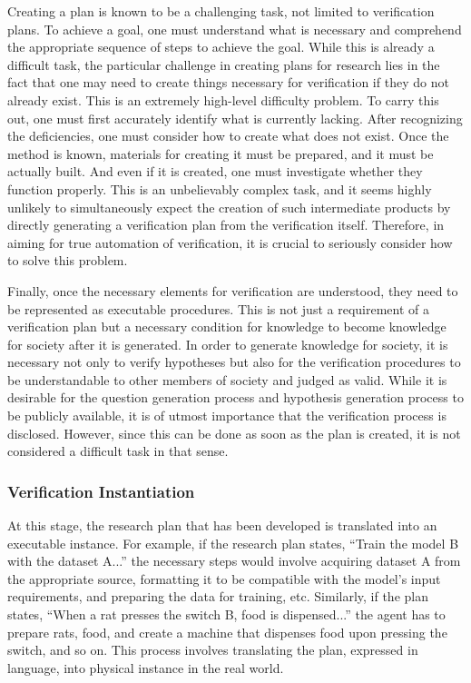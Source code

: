 \documentclass{book}
\begin{document}
Creating a plan is known to be a challenging task, not limited to verification plans. To achieve a goal, one must understand what is necessary and comprehend the appropriate sequence of steps to achieve the goal. While this is already a difficult task, the particular challenge in creating plans for research lies in the fact that one may need to create things necessary for verification if they do not already exist. This is an extremely high-level difficulty problem. To carry this out, one must first accurately identify what is currently lacking. After recognizing the deficiencies, one must consider how to create what does not exist. Once the method is known, materials for creating it must be prepared, and it must be actually built. And even if it is created, one must investigate whether they function properly. This is an unbelievably complex task, and it seems highly unlikely to simultaneously expect the creation of such intermediate products by directly generating a verification plan from the verification itself. Therefore, in aiming for true automation of verification, it is crucial to seriously consider how to solve this problem.

Finally, once the necessary elements for verification are understood, they need to be represented as executable procedures. This is not just a requirement of a verification plan but a necessary condition for knowledge to become knowledge for society after it is generated. In order to generate knowledge for society, it is necessary not only to verify hypotheses but also for the verification procedures to be understandable to other members of society and judged as valid. While it is desirable for the question generation process and hypothesis generation process to be publicly available, it is of utmost importance that the verification process is disclosed. However, since this can be done as soon as the plan is created, it is not considered a difficult task in that sense.

\subsubsection{Verification Instantiation} 
At this stage, the research plan that has been developed is translated into an executable instance. For example, if the research plan states, ``Train the model B with the dataset A...'' the necessary steps would involve acquiring dataset A from the appropriate source, formatting it to be compatible with the model's input requirements, and preparing the data for training, etc. Similarly, if the plan states, ``When a rat presses the switch B, food is dispensed...'' the agent has to prepare rats, food, and create a machine that dispenses food upon pressing the switch, and so on. This process involves translating the plan, expressed in language, into physical instance in the real world.
\end{document}

